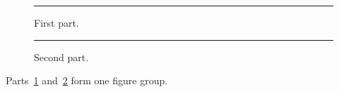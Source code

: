 \documentclass{article}
\begin{document}
\begin{subfigures}
\begin{figure}[ht]
\centering\rule{3cm}{2cm}
\caption{First part.\label{fig:sf-a}}
\end{figure}
\begin{figure}[ht]
\centering\rule{3cm}{2cm}
\caption{Second part.\label{fig:sf-b}}
\end{figure}
\end{subfigures}
Parts~\ref{fig:sf-a} and~\ref{fig:sf-b} form one figure group.
\end{document}
